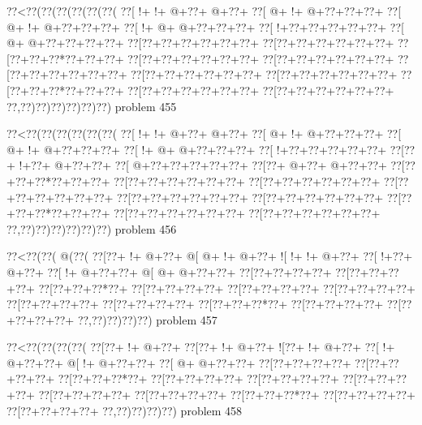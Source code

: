 \vbox{\vbox{\goo
\0??<\0??(\0??(\0??(\0??(\0??(\0??(
\0??[\- !+\- !+\- @+\0??+\- @+\0??+
\0??[\- @+\- !+\- @+\0??+\0??+\0??+
\0??[\- @+\- !+\- @+\0??+\0??+\0??+
\0??[\- !+\- @+\- @+\0??+\0??+\0??+
\0??[\- !+\0??+\0??+\0??+\0??+\0??+
\0??[\- @+\- @+\0??+\0??+\0??+\0??+
\0??[\0??+\0??+\0??+\0??+\0??+\0??+
\0??[\0??+\0??+\0??+\0??+\0??+\0??+
\0??[\0??+\0??+\0??*\0??+\0??+\0??+
\0??[\0??+\0??+\0??+\0??+\0??+\0??+
\0??[\0??+\0??+\0??+\0??+\0??+\0??+
\0??[\0??+\0??+\0??+\0??+\0??+\0??+
\0??[\0??+\0??+\0??+\0??+\0??+\0??+
\0??[\0??+\0??+\0??+\0??+\0??+\0??+
\0??[\0??+\0??+\0??*\0??+\0??+\0??+
\0??[\0??+\0??+\0??+\0??+\0??+\0??+
\0??[\0??+\0??+\0??+\0??+\0??+\0??+
\0??,\0??)\0??)\0??)\0??)\0??)\0??)
}
\hfil problem 455\hfil\break
}

\vbox{\vbox{\goo
\0??<\0??(\0??(\0??(\0??(\0??(\0??(
\0??[\- !+\- !+\- @+\0??+\- @+\0??+
\0??[\- @+\- !+\- @+\0??+\0??+\0??+
\0??[\- @+\- !+\- @+\0??+\0??+\0??+
\0??[\- !+\- @+\- @+\0??+\0??+\0??+
\0??[\- !+\0??+\0??+\0??+\0??+\0??+
\0??[\0??+\- !+\0??+\- @+\0??+\0??+
\0??[\- @+\0??+\0??+\0??+\0??+\0??+
\0??[\0??+\- @+\0??+\- @+\0??+\0??+
\0??[\0??+\0??+\0??*\0??+\0??+\0??+
\0??[\0??+\0??+\0??+\0??+\0??+\0??+
\0??[\0??+\0??+\0??+\0??+\0??+\0??+
\0??[\0??+\0??+\0??+\0??+\0??+\0??+
\0??[\0??+\0??+\0??+\0??+\0??+\0??+
\0??[\0??+\0??+\0??+\0??+\0??+\0??+
\0??[\0??+\0??+\0??*\0??+\0??+\0??+
\0??[\0??+\0??+\0??+\0??+\0??+\0??+
\0??[\0??+\0??+\0??+\0??+\0??+\0??+
\0??,\0??)\0??)\0??)\0??)\0??)\0??)
}
\hfil problem 456\hfil\break
}

\vbox{\vbox{\goo
\0??<\0??(\0??(\- @(\0??(
\0??[\0??+\- !+\- @+\0??+
\- @[\- @+\- !+\- @+\0??+
\- ![\- !+\- !+\- @+\0??+
\0??[\- !+\0??+\- @+\0??+
\0??[\- !+\- @+\0??+\0??+
\- @[\- @+\- @+\0??+\0??+
\0??[\0??+\0??+\0??+\0??+
\0??[\0??+\0??+\0??+\0??+
\0??[\0??+\0??+\0??*\0??+
\0??[\0??+\0??+\0??+\0??+
\0??[\0??+\0??+\0??+\0??+
\0??[\0??+\0??+\0??+\0??+
\0??[\0??+\0??+\0??+\0??+
\0??[\0??+\0??+\0??+\0??+
\0??[\0??+\0??+\0??*\0??+
\0??[\0??+\0??+\0??+\0??+
\0??[\0??+\0??+\0??+\0??+
\0??,\0??)\0??)\0??)\0??)
}
\hfil problem 457\hfil\break
}

\vbox{\vbox{\goo
\0??<\0??(\0??(\0??(\0??(
\0??[\0??+\- !+\- @+\0??+
\0??[\0??+\- !+\- @+\0??+
\- ![\0??+\- !+\- @+\0??+
\0??[\- !+\- @+\0??+\0??+
\- @[\- !+\- @+\0??+\0??+
\0??[\- @+\- @+\0??+\0??+
\0??[\0??+\0??+\0??+\0??+
\0??[\0??+\0??+\0??+\0??+
\0??[\0??+\0??+\0??*\0??+
\0??[\0??+\0??+\0??+\0??+
\0??[\0??+\0??+\0??+\0??+
\0??[\0??+\0??+\0??+\0??+
\0??[\0??+\0??+\0??+\0??+
\0??[\0??+\0??+\0??+\0??+
\0??[\0??+\0??+\0??*\0??+
\0??[\0??+\0??+\0??+\0??+
\0??[\0??+\0??+\0??+\0??+
\0??,\0??)\0??)\0??)\0??)
}
\hfil problem 458\hfil\break
}

